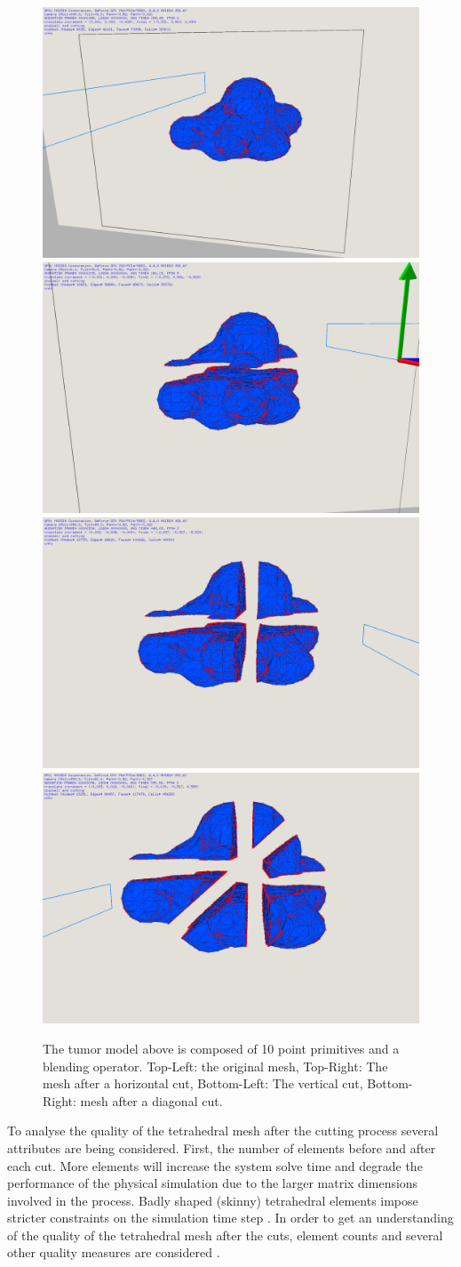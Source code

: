 \begin{figure}[H]
  \centering
  \includegraphics[width=0.4\linewidth]{figures/cutting/tumor01.png}
  \includegraphics[width=0.4\linewidth]{figures/cutting/tumor02.png}
  \includegraphics[width=0.4\linewidth]{figures/cutting/tumor03.png}
  \includegraphics[width=0.4\linewidth]{figures/cutting/tumor04.png}
  
  \caption{\label{fig:tumor}
  {The tumor model above is composed of 10 point primitives and a blending operator. Top-Left: the original mesh, Top-Right:
  The mesh after a horizontal cut, Bottom-Left: The vertical cut, Bottom-Right: mesh after a diagonal cut.}
}
\end{figure}

To analyse the quality of the tetrahedral mesh after the cutting process several attributes are being considered. First, the 
number of elements before and after each cut. More elements will increase the system solve time and degrade the performance of the 
physical simulation due to the larger matrix dimensions involved in the process. Badly shaped (skinny) tetrahedral elements impose stricter constraints 
on the simulation time step \cite{Steinemann, Ganovelli2000}. In order to get an understanding of the quality of the tetrahedral mesh after the cuts, element
counts and several other quality measures are considered \cite{parthasarathy1994comparison}. 


